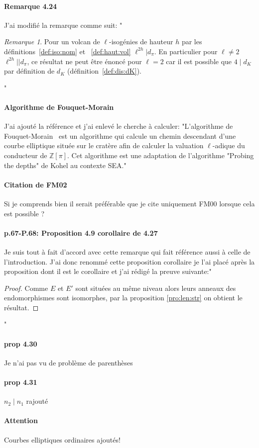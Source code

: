 \documentclass[10pt,a4paper]{article}
\theoremstyle{plain}
\theoremstyle{definition}
\theoremstyle{definition}
\theoremstyle{definition}
\theoremstyle{definition}
\theoremstyle{definition}
\theoremstyle{remark}
\newtheorem{rem}[thm]{Remarque}
\theoremstyle{remark}
\theoremstyle{definition}
\begin{document}
\paragraph{Remarque 4.24}{J'ai modifié la remarque comme suit:
"\begin{rem} 
\label{rem:lie:dp:dk}
Pour un volcan de $\ell$-isogénies de hauteur $h$ par les 
définitions~\ref{def:iso:nom} et ~\ref{def:haut:vol} $\ell^{2h} | d_{\pi}$.
En particulier pour $\ell \neq 2$ $\ell^{2h}||d_{\pi}$, ce résultat ne peut être 
énoncé  pour $\ell=2$ car il est possible que $4 \mid d_K$ par définition de $d_K$
(définition~\ref{def:dis:dK}).
\end{rem}"}

\paragraph{Algorithme de Fouquet-Morain}{J'ai ajouté la référence et j'ai 
enlevé le cherche à calculer: "L'algorithme de 
Fouquet-Morain~\cite{FouquetMorain02} est un algorithme qui 
calcule un chemin descendant d'une courbe elliptique située sur le cratère afin
de calculer la valuation $\ell$-adique du conducteur de $\mathbb{Z}[\pi]$. Cet
algorithme est une adaptation de l'algorithme "Probing the depths" de Kohel \cite[Section 4.2]{Kohel96} au contexte SEA."}

\paragraph{Citation de FM02}{Si je comprends bien il serait préférable que je cite uniquement FM00 lorsque cela est possible ?}

\paragraph{p.67-P.68: Proposition 4.\color{red}{2}\color{black}9 corollaire de 
4.27}{Je suis tout à fait d'accord avec cette remarque qui fait référence aussi
à celle de l'introduction. J'ai donc renommé cette proposition corollaire je 
l'ai placé après la proposition dont il est le corollaire et j'ai rédigé la 
preuve suivante:"\begin{proof}
Comme $E$ et $E'$ sont situées au même niveau alors leurs anneaux 
des endomorphismes sont isomorphes, par la proposition \ref{pro:len:str} on 
obtient le résultat.
\end{proof}"}

\paragraph{prop 4.30}{Je n'ai pas vu de problème de parenthèses}

\paragraph{prop 4.31}{$n_2 \mid n_1$ rajouté}

\paragraph{Attention}{Courbes elliptiques ordinaires ajoutés!}


\end{document}
